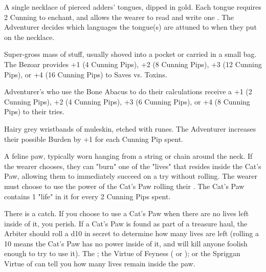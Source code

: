 
\MARVELS[
  Name=Adder's Tongue,
  Link=marvels-adders-tongue,
  Pips=2+
]

A single necklace of pierced adders' tongues, dipped in gold. Each tongue requires 2 Cunning to enchant, and allows the wearer to read and write one  . The Adventurer decides which languages the tongue(s) are attuned to when they put on the necklace.


\MARVELS[
  Name=Bezoar,
  Link=marvels-bezoar,
  Pips=4+
]

Super-gross mass of stuff, usually shoved into a pocket or carried in a small bag. The Bezoar provides +1 (4 Cunning Pips), +2 (8 Cunning Pips), +3 (12 Cunning Pips), or +4 (16 Cunning Pips) to Saves vs. Toxins.

\MARVELS[
  Name=Bone Abacus,
  Link=marvels-bone-abacus,
  Pips=2+
]

Adventurer's who use the Bone Abacus to do their calculations receive a +1 (2 Cunning Pips), +2 (4 Cunning Pips), +3 (6 Cunning Pips), or +4 (8 Cunning Pips) to their  tries.

\MARVELS[
  Name=Bracelets of Muleskin,
  Link=marvels-bracelets-muleskin,
  Pips=1+
]

Hairy grey wristbands of muleskin, etched with runes.  The Adventurer increases their possible Burden by +1 for each Cunning Pip spent.


\MARVELS[
  Name=Cat's Paw,
  Link=marvels-cats-paw,
  Pips=2+
]

A feline paw, typically worn hanging from a string or chain around the neck. If the wearer chooses, they can "burn" one of the "lives" that resides inside the Cat's Paw, allowing them to immediately succeed on a \DEATH try without rolling. The wearer must choose to use the power of the Cat's Paw  rolling their \DEATH. The Cat's Paw contains 1 "life" in it for every 2 Cunning Pips spent.

There is a catch. If you choose to use a Cat's Paw when there are no lives left inside of it, you  perish. If a Cat's Paw is found as part of a treasure haul, the Arbiter should roll a d10 in secret to determine how many lives are left (rolling a 10 means the Cat's Paw has no power inside of it, and will kill anyone foolish enough to try to use it). The ; the Virtue of Feyness ( or ); or the Spriggan Virtue of  can tell you how many lives remain inside the paw.


